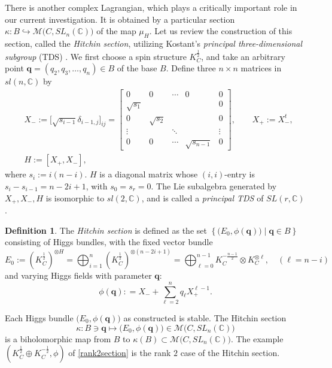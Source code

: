 \documentclass{amsart}
\theoremstyle{definition}
\newtheorem{Def}[thm]{Definition}
\numberwithin{equation}{section}
\numberwithin{figure}{section}
\def\tensor{\otimes}
\def\dsum{\oplus}
\newcommand{\be}{\begin{equation}}
\newcommand{\ee}{\end{equation}}
\newcommand{\bC}{{\mathbb{C}}}
\newcommand{\cM}{{\mathcal{M}}}
\newcommand{\half}{{\frac{1}{2}}}
\newcommand{\bq}{{\mathbf{q}}}
\begin{document}
There is another complex Lagrangian, which plays a
critically important role in our current investigation. 
It is obtained by a particular section 
$\kappa: B\hookrightarrow \cM\big(C,SL_n(\bC)\big)$
of the map $\mu_H$. Let us review the construction 
of this section, called the \emph{Hitchin section}, 
 utilizing Kostant's 
\emph{principal three-dimensional subgroup}
(TDS)
\cite{Kostant}. We first choose a spin structure 
$K_C^\half$, and take an arbitrary point
$
\mathbf{q}=(q_2,q_3,\dots,q_n)
\in B$
of the  base $B$.
Define three $n\times n$ matrices in $sl(n,\bC)$ by
\be
\label{TDS}
\begin{aligned}
&X_- := \big[ \sqrt{s_{i-1}} \delta_{i-1,j}\big]_{ij}
=\begin{bmatrix}
0&0&\cdots&0&0\\
\sqrt{s_1}&&&&0\\
0&\sqrt{s_2}&&&0\\
\vdots&&\ddots&&\vdots\\
0&0&\cdots&\sqrt{s_{n-1}}&0
\end{bmatrix},
\qquad  X_+ := X_-^t,
\\
& H :=[X_+,X_-],
\end{aligned}
\ee
where $s_i := i(n-i)$.
$H$ is a diagonal matrix whose 
$(i,i)$-entry is $s_i-s_{i-1}
= n - 2i+1$, with $s_0=s_r=0$. 
The Lie subalgebra generated by $X_+,X_-,H$ is isomorphic to 
$sl(2,\bC)$, and  is called  
a \emph{principal TDS} of $SL(r,\bC)$. 

\begin{Def}
\label{Hitchin section}
The \emph{Hitchin section} is defined as the set
$\left\{\big(E_0,\phi(\mathbf{q})\big)\;\big|\;\mathbf{q}\in B\right\}$
consisting of Higgs bundles, with the fixed vector bundle 
\be
\label{E0}
E_0 := \left(K_C^\half\right)^{\tensor H}
=\bigoplus_{i=1}^n \left(K_C^\half\right)^{\tensor (n-2i+1)}
=\bigoplus_{\ell=0}^{n-1} K_C^{-\frac{n-1}{2}}\tensor K_C^{\tensor \ell},
\quad(\ell = n-i)
\ee
and varying Higgs fields  with parameter $\mathbf{q}$:
\be\label{phi q}
\phi(\mathbf{q}): = 
X_- + \sum_{\ell = 2}^n q_\ell X_+ ^{\ell-1}.
\ee
\end{Def}


Each Higgs bundle $\big(E_0,\phi(\mathbf{q})\big)$
as constructed is stable.
The Hitchin section 
$$
\kappa: B\owns \bq
\longmapsto \big(E_0,\phi(\mathbf{q})\big)
\in  \cM\big(C,SL_n(\bC)\big)
$$
is a biholomorphic map from 
$B$ to $\kappa(B)\subset \cM\big(C,SL_n(\bC)\big)$. 
The example $\left(K_C^\half\dsum K_C^{-\half}, \phi\right)$
of \eqref{rank2section} is the rank $2$ case of the
Hitchin section. 
\end{document}

